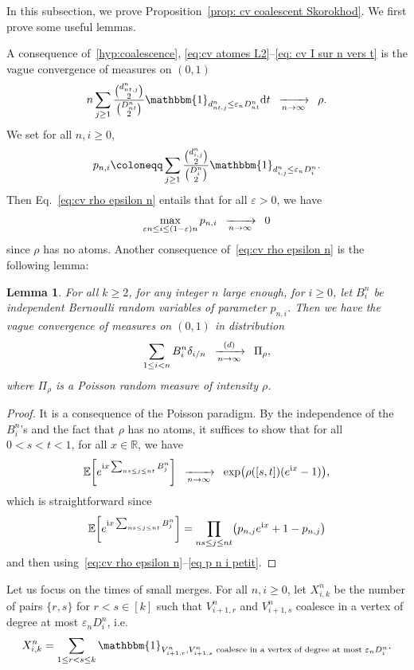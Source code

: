 \documentclass[10pt]{amsart}
\newtheorem{lemm}[theo]{Lemma}\newtheorem{prop}[theo]{Proposition}\newtheorem{coro}[theo]{Corollary}\newtheorem{conj}[theo]{Conjecture}
\theoremstyle{definition}\newtheorem{defi}[theo]{Definition}\newtheorem{rema}[theo]{Remark}\newtheorem{exam}[theo]{Example}\newtheorem{exem}[theo]{Example}\newtheorem{nota}[theo]{Notation}
\newcommand{\e}{\varepsilon}
\newcommand{\cv}[1][n]{\enskip\xrightarrow[#1 \to \infty]{}\enskip}
\newcommand{\cvloi}[1][n]{\enskip\xrightarrow[#1 \to \infty]{(d)}\enskip}
\newcommand{\rmd}{\mathrm{d}}
\newcommand{\rmi}{\mathrm{i}}
\newcommand{\R}{\mathbb{R}}
\newcommand{\E}{\mathbb{E}}
\newcommand{\1}{\mathbbm{1}}
\let\originalleft\left
\let\originalright\right
\renewcommand{\left}{\mathopen{}\mathclose\bgroup\originalleft}
\renewcommand{\right}{\aftergroup\egroup\originalright}
\renewcommand*{\to}{\mathchoice{\longrightarrow}{\rightarrow}{\rightarrow}{\rightarrow}}
\begin{document}
In this subsection, we prove Proposition~\ref{prop: cv coalescent Skorokhod}. We first prove some useful lemmas.

A consequence of~\ref{hyp:coalescence}, \eqref{eq:cv atomes L2}--\eqref{eq: cv I sur n vers t} is the vague convergence of measures on $(0,1)$
\begin{equation}\label{eq:cv rho epsilon n}
n\sum_{j\ge 1} \frac{\binom{d^n_{nt,j}}{2}}{\binom{D^n_{nt}}{2}} \1_{d^n_{nt,j}\le \e_n D^n_{nt}} \rmd t
\cv[n]
\rho.
\end{equation}
We set for all $n,i\ge 0$,
\[
p_{n,i}\coloneqq \sum_{j\ge 1} \frac{\binom{d^n_{i,j}}{2}}{\binom{D^n_{i}}{2}} \1_{d^n_{i,j}\le \e_n D^n_{i}}.
\]
Then Eq.~\eqref{eq:cv rho epsilon n} entails that for all $\e>0$, we have
\begin{equation}\label{eq p n i petit}
\max_{\e n \le i \le (1-\e)n} p_{n,i} \cv[n] 0
\end{equation}
since $\rho$ has no atoms. Another consequence of~\eqref{eq:cv rho epsilon n} is the following lemma:

\begin{lemm}\label{lemme Bernoulli Poisson}
For all $k\ge 2$, for any integer $n$ large enough, for $i\ge 0$, let $B^n_{i}$ be independent Bernoulli random variables of parameter $p_{n,i}$. Then we have the {vague} convergence of measures on $(0,1)$ in distribution
\[
\sum_{1\le i <n} B^n_{i} \delta_{i/n}
\cvloi[n]
\Pi_{\rho},
\]
where $\Pi_\rho$ is a Poisson random measure of intensity $\rho$.
\end{lemm}

\begin{proof}
It is a consequence of the Poisson paradigm. By the independence of the $B^n_{i}$'s and the fact that $\rho$ has no atoms, it suffices to show that for all $0<s<t<1$, for all $x\in \R$, we have
\[
\E \left[e^{\rmi x \sum_{ns \le j \le nt} B^n_{j}}
\right]
\cv[n]
\exp\left(\rho([s,t])(e^{\rmi x }-1)\right),
\]
which is straightforward since
\[
\E \left[e^{\rmi x \sum_{ns \le j \le nt} B^n_{j}}
\right] = \prod_{ns \le j \le nt} \left(p_{n,j}e^{\rmi x} +1-p_{n,j}
\right)
\]
and then using~\eqref{eq:cv rho epsilon n}--\eqref{eq p n i petit}.
\end{proof}

Let us focus on the times of small merges. For all $n,i\ge 0$, let $X^n_{i,k}$ be the number of pairs $\{r,s\}$ for $r<s \in[k]$ such that $V^n_{i+1,r}$ and $V^n_{i+1,s}$ coalesce in a vertex of degree at most $\e_n D^n_i$, i.e.
\[
X^n_{i,k} = \sum_{1\le r < s\le k} \1_{V^n_{i+1,r}, V^n_{i+1,s}
\text{ coalesce in a vertex of degree at most } \e_n D^n_i}.
\]
\end{document}
